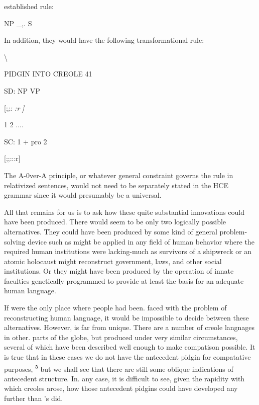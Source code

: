 established rule:

\ea\label{ex:110}
 NP \_,. S
\glt
\z

In addition, they would have the following transformational rule:

{\textbackslash}

PIDGIN INTO CREOLE 41

\ea\label{ex:111}
 SD: NP VP
\glt
\z

[;\textit{;}\textit{:} \textit{:r} \textit{]}

1 2 ....

SC: 1 + pro 2

[;;:::r]

The A-0ver-A principle, or whatever general constraint governs the  rule in relativized sentences, would not need to be separately stated in the HCE grammar since it would presumably be a universal.

All that remains for us is to ask how these quite substantial innovations could have been produced. There would seem to be only two logically possible alternatives. They could have been produced by some kind of general problem-solving device such as might be applied in any field of human behavior where the required human institutions were lacking-much as survivors of a shipwreck or an atomic holocaust might reconstruct government, laws, and other social institutions. Or they might have been produced by the operation of innate faculties genetically programmed to provide at least the basis for an adequate human language.

If  were the only place where people had been. faced with the problem of reconstructing human language, it would be impossible to decide between these alternatives. However,  is far from unique. There are a number of creole langnages in other. parts of the globe, but produced under very similar circumstances, several of which have been described well enough to make compatison possible. It is true that in these cases we do not have the antecedent pidgin for compatative purposes, \textsuperscript{5} but we shall see that there are still some oblique indications of antecedent structure. In. any case, it is difficult to see, given the rapidity with which creoles arose, how those antecedent pidgins could have developed any further than 's did.


